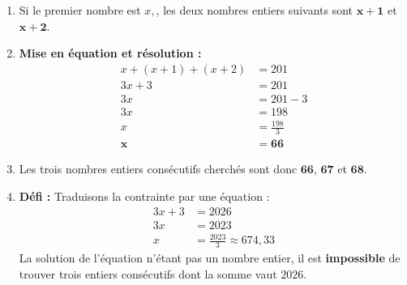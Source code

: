 \documentclass[a4paper]{book}
\begin{document}
    
    \begin{exercice}
        \begin{enumerate}
            \item Si le premier nombre est $x,$, les deux nombres entiers suivants sont $\mathbf{x + 1}$ et $\mathbf{x + 2}$.
            \item \textbf{Mise en équation et résolution :}
            \begin{align*}
                x + (x + 1) + (x + 2) &= 201 \\
                3x + 3 &= 201 \\
                3x &= 201 - 3 \\
                3x &= 198 \\
                x &= \frac{198}{3} \\
                \mathbf{x} &\mathbf{= 66}
            \end{align*}
            \item Les trois nombres entiers consécutifs cherchés sont donc $\mathbf{66}$, $\mathbf{67}$ et $\mathbf{68}$.
            \item \textbf{Défi :} Traduisons la contrainte par une équation :
            \begin{align*}
                3x + 3 &= 2026 \\
                3x &= 2023 \\
                x &= \frac{2023}{3} \approx 674,33
            \end{align*}
            La solution de l'équation n'étant pas un nombre entier, il est \textbf{impossible} de trouver trois entiers consécutifs dont la somme vaut $2026$.
        \end{enumerate}
    \end{exercice}
    
\end{document}
